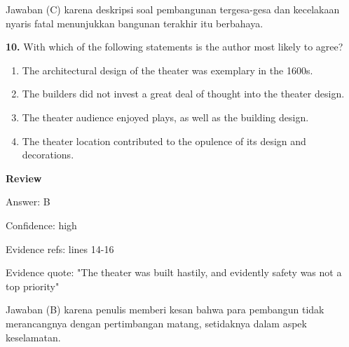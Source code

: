 \documentclass[12pt]{article}
\begin{document}
Jawaban (C) karena deskripsi soal pembangunan tergesa-gesa dan kecelakaan nyaris fatal menunjukkan bangunan terakhir itu berbahaya.\par
\endgroup
\par
\vspace{0.25\baselineskip}
\noindent\textbf{10.} With which of the following statements is the author most likely to agree?
\begin{enumerate}[label=(\Alph*),leftmargin=*,itemsep=0.2em]
\item The architectural design of the theater was exemplary in the 1600s.
\item The builders did not invest a great deal of thought into the theater design.
\item The theater audience enjoyed plays, as well as the building design.
\item The theater location contributed to the opulence of its design and decorations.
\end{enumerate}
\par
\begingroup
\setlength{\parskip}{0pt}
\setlength{\parindent}{0pt}
\textbf{Review}\par
Answer: B\par
Confidence: high\par
Evidence refs: lines 14-16\par
Evidence quote: "The theater was built hastily, and evidently safety was not a top priority"\par
Jawaban (B) karena penulis memberi kesan bahwa para pembangun tidak merancangnya dengan pertimbangan matang, setidaknya dalam aspek keselamatan.\par
\endgroup
\par
\vspace{0.25\baselineskip}
\end{document}
